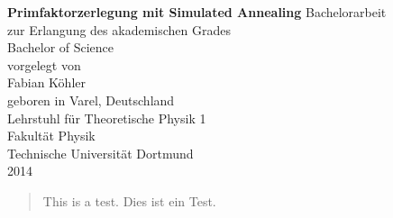 \thispagestyle{empty}

\thispagestyle{empty}
\begin{center}
  \vspace*{\fill}
  \huge\textbf{Primfaktorzerlegung mit Simulated Annealing}
  \vfill
  \vfill
  \Large
  Bachelorarbeit \\
  zur Erlangung des akademischen Grades
  \\ Bachelor of Science \\[20pt]
  \normalsize
  vorgelegt von \\[5pt]
  {\Large Fabian Köhler} \\[5pt]
  geboren in Varel, Deutschland \\
  \vspace{20pt}
  Lehrstuhl für Theoretische Physik 1 \\
  Fakultät Physik \\
  Technische Universität Dortmund \\
  2014
\end{center}
\newpage

\thispagestyle{empty}
\begin{abstract}
  \vfill
		This is a test.
  \vfill
		Dies ist ein Test.
  \vfill
\end{abstract}
\vfill
\newpage

\thispagestyle{empty}
\tableofcontents
\newpage

\setcounter{page}{1}
